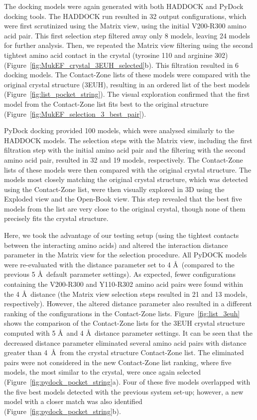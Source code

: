 \documentclass[twocolumn]{bmcart}%
\def\OpBook {Open-Book view\xspace}
\def\ExpView {Exploded view\xspace}
\def\MatView {Matrix view\xspace}
\def\CoZoList{Contact-Zone list\xspace}
\def\CoZoLists{Contact-Zone lists\xspace}
\begin{document}
The docking models were again generated with both HADDOCK and PyDock docking tools.
The HADDOCK run resulted in 32 output configurations, which were first scrutinized using the \MatView, using the initial V200-R300 amino acid pair. 
This first selection step filtered away only 8 models, leaving 24 models for further analysis. 
Then, we repeated the \MatView filtering using the second tightest amino acid contact in the crystal (tyrosine 110 and arginine 302) (Figure~\ref{fig:MukEF_crystal_3EUH_selected}b). 
This filtration resulted in 6 docking models. 
The \CoZoLists of these models were compared with the original crystal structure (3EUH), resulting in an ordered list of the best models (Figure~\ref{fig:list_pocket_string}).
The visual exploration confirmed that the first model from the \CoZoList fits best to the original structure (Figure~\ref{fig:MukEF_selection_3_best_pair}). 

PyDock docking provided 100 models, which were analysed similarly to the HADDOCK models. 
The selection steps with the \MatView, including the first filtration step with the initial amino acid pair and the filtering with the second amino acid pair, resulted in 32 and 19 models, respectively. 
The \CoZoLists of these models were then compared with the original crystal structure.
The models most closely matching the original crystal structure, which was detected using the \CoZoList, were then visually explored in 3D using the \ExpView and the \OpBook.
This step revealed that the best five models from the list are very close to the original crystal, though none of them precisely fits the crystal structure.

Here, we took the advantage of our testing setup (using the tightest contacts between the interacting amino acids) and altered the interaction distance parameter in the \MatView for the selection procedure. 
All PyDOCK models were re-evaluated with the distance parameter set to 4 \AA~(compared to the previous 5 \AA~default parameter settings). 
As expected, fewer configurations containing the V200-R300 and Y110-R302 amino acid pairs were found within the 4 \AA~distance (the \MatView selection steps resulted in 21 and 13 models, respectively).
However, the altered distance parameter also resulted in a different ranking of the configurations in the \CoZoLists.
Figure~\ref{fig:list_3euh} shows the comparison of the \CoZoLists for the 3EUH crystal structure computed with 5 \AA~and 4 \AA~distance parameter settings.
It can be seen that the decreased distance parameter eliminated several amino acid pairs with distance greater than 4~\AA~from the crystal structure \CoZoList.
The eliminated pairs were not considered in the new \CoZoList ranking, where five models, the most similar to the crystal, were once again selected (Figure~\ref{fig:pydock_pocket_string}a). 
Four of these five models overlapped with the five best models detected with the previous system set-up; however, a new model with a closer match was also identified (Figure~\ref{fig:pydock_pocket_string}b).
\end{document}
